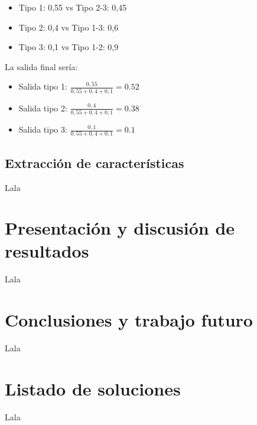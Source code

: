 \begin{itemize}
	\item Tipo 1: 0,55 vs Tipo 2-3: 0,45
	\item Tipo 2: 0,4 vs Tipo 1-3: 0,6
	\item Tipo 3: 0,1 vs Tipo 1-2: 0,9
\end{itemize}

La salida final sería:

\begin{itemize}
	\item Salida tipo 1: $ \frac{0,55}{0,55 + 0,4 + 0,1} = 0.52 $
	\item Salida tipo 2: $ \frac{0,4}{0,55 + 0,4 + 0,1} = 0.38 $
	\item Salida tipo 3: $ \frac{0,1}{0,55 + 0,4 + 0,1} = 0.1 $
\end{itemize}

\subsection{Extracción de características}

Lala

\section{Presentación y discusión de resultados}

Lala

\section{Conclusiones y trabajo futuro}

Lala

\section{Listado de soluciones}

Lala


\newpage


